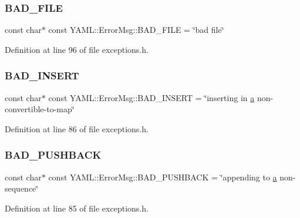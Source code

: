 \subsubsection{\texorpdfstring{BAD\_FILE}{BAD\_FILE}}
{\footnotesize\ttfamily const char$\ast$ const Y\+A\+M\+L\+::\+Error\+Msg\+::\+B\+A\+D\+\_\+\+F\+I\+LE = \char`\"{}bad file\char`\"{}}



Definition at line 96 of file exceptions.\+h.

\mbox{\label{namespace_y_a_m_l_1_1_error_msg_a21b49e79d719371f115224eb36e1d81d}} 
\subsubsection{\texorpdfstring{BAD\_INSERT}{BAD\_INSERT}}
{\footnotesize\ttfamily const char$\ast$ const Y\+A\+M\+L\+::\+Error\+Msg\+::\+B\+A\+D\+\_\+\+I\+N\+S\+E\+RT = \char`\"{}inserting in \mbox{\hyperlink{glad_8h_ac8729153468b5dcf13f971b21d84d4e5}{a}} non-\/convertible-\/to-\/map\char`\"{}}



Definition at line 86 of file exceptions.\+h.

\mbox{\label{namespace_y_a_m_l_1_1_error_msg_afc4f10ac963dc01d9a4eaa6fb954bb5b}} 
\subsubsection{\texorpdfstring{BAD\_PUSHBACK}{BAD\_PUSHBACK}}
{\footnotesize\ttfamily const char$\ast$ const Y\+A\+M\+L\+::\+Error\+Msg\+::\+B\+A\+D\+\_\+\+P\+U\+S\+H\+B\+A\+CK = \char`\"{}appending to \mbox{\hyperlink{glad_8h_ac8729153468b5dcf13f971b21d84d4e5}{a}} non-\/sequence\char`\"{}}



Definition at line 85 of file exceptions.\+h.

\mbox{\label{namespace_y_a_m_l_1_1_error_msg_afd848e3c4478da335bb779a92a94691e}} 
